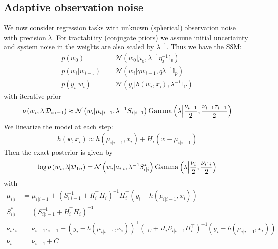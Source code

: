 \subsection{Adaptive observation noise} \label{sec:gamma-prior}

We now consider regression tasks with unknown (spherical) observation noise with precision $\lambda$. For tractability (conjugate priors) we assume initial uncertainty and system noise in the weights are also scaled by $\lambda^{-1}$. Thus we have the SSM:
\begin{align}
p\left(w_{0}\right) & =\mathcal{N}\left(w_{0}\vert\mu_{0},\lambda^{-1}\eta_{0}^{-1}\mathbb{I}_{p}\right)\\
p\left(w_{i}\vert w_{i-1}\right) & =\mathcal{N}\left(w_{i}\vert\gamma w_{i-1},q\lambda^{-1}\mathbb{I}_{p}\right)\\
p\left(y_{i}\vert w_{i}\right) & =\mathcal{N}\left(y_{i}\vert h\left(w_{i},x_{i}\right),\lambda^{-1}\mathbb{I}_{C}\right)
\end{align}
with iterative prior
\begin{align}
p\left(w_{i},\lambda\vert\mathcal{D}_{i:i-1}\right)\approx\mathcal{N}\left(w_{i}\vert\mu_{i\vert i-1},\lambda^{-1}S_{i\vert i-1}\right){\rm Gamma}\left(\lambda\middle\vert\frac{\nu_{i-1}}{2},\frac{\nu_{i-1}\tau_{i-1}}{2}\right)
\end{align}
We linearize the model at each step:
\begin{align}
h\left(w,x_{i}\right)\approx h\left(\mu_{i\vert i-1},x_{i}\right)+H_{i}\left(w-\mu_{i\vert i-1}\right)
\end{align}
Then the exact posterior is given by
\begin{align}
\log p\left(w_{i},\lambda\vert\mathcal{D}_{1:i}\right) & =\mathcal{N}\left(w_{i}\vert\mu_{i\vert i},\lambda^{-1}S^*_{i\vert i}\right){\rm Gamma}\left(\lambda\middle\vert\frac{\nu_{i}}{2},\frac{\nu_{i}\tau_{i}}{2}\right)\\
\end{align}
with
\begin{align}
\mu_{i\vert i} & =\mu_{i\vert i-1}+\left(S_{i\vert i-1}^{-1}+H_{i}^{\top}H_{i}\right)^{-1}H_{i}^{\top}\left(y_{i}-h(\mu_{i\vert i-1},x_i)\right)\\
S^*_{i\vert i} & = \left(S_{i\vert i-1}^{-1}+H_{i}^{\top}H_{i}\right)^{-1}\\
\nu_{i}\tau_{i} & =\nu_{i-1}\tau_{i-1}+\left(y_{i}-h(\mu_{i\vert i-1},x_i)\right)^{\top}\left(\mathbb{I}_{C}+H_{i}S_{i\vert i-1}H_{i}^{\top}\right)^{-1}\left(y_{i}-h(\mu_{i\vert i-1},x_i)\right)\\
\nu_{i} & =\nu_{i-1}+C
\end{align}

